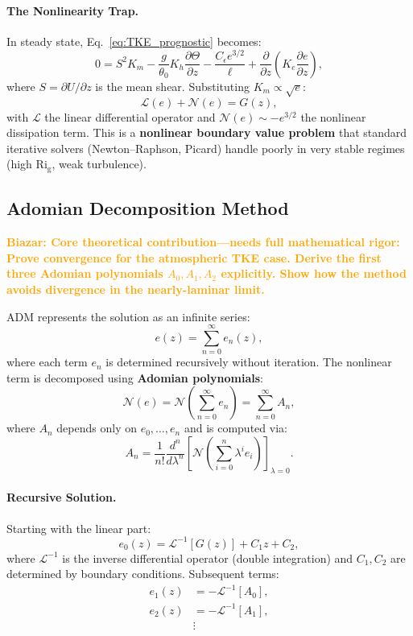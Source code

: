 \documentclass[twocolumn,11pt]{article}
\newcommand{\Rig}{\text{Ri}_{\text{g}}}
\newcommand{\BIAZAR}[1]{\textcolor{orange}{\textbf{Biazar: #1}}}
\begin{document}
\paragraph{The Nonlinearity Trap.} In steady state, Eq.~\eqref{eq:TKE_prognostic} becomes:
\begin{equation}
0 = S^2 K_m - \frac{g}{\theta_0}K_h\frac{\partial \Theta}{\partial z} - \frac{C_\epsilon e^{3/2}}{\ell} + \frac{\partial}{\partial z}\left(K_e \frac{\partial e}{\partial z}\right),
\end{equation}
where $S = \partial U / \partial z$ is the mean shear. Substituting $K_m \propto \sqrt{e}$:
\begin{equation}
\mathcal{L}(e) + \mathcal{N}(e) = G(z),
\end{equation}
with $\mathcal{L}$ the linear differential operator and $\mathcal{N}(e) \sim -e^{3/2}$ the nonlinear dissipation term. This is a \textbf{nonlinear boundary value problem} that standard iterative solvers (Newton--Raphson, Picard) handle poorly in very stable regimes (high $\Rig$, weak turbulence).

\subsection{Adomian Decomposition Method}

\BIAZAR{Core theoretical contribution—needs full mathematical rigor: Prove convergence for the atmospheric TKE case. Derive the first three Adomian polynomials $A_0, A_1, A_2$ explicitly. Show how the method avoids divergence in the nearly-laminar limit.}

ADM represents the solution as an infinite series:
\begin{equation}
e(z) = \sum_{n=0}^\infty e_n(z),
\end{equation}
where each term $e_n$ is determined recursively without iteration. The nonlinear term is decomposed using \textbf{Adomian polynomials}:
\begin{equation}
\mathcal{N}(e) = \mathcal{N}\left(\sum_{n=0}^\infty e_n\right) = \sum_{n=0}^\infty A_n,
\end{equation}
where $A_n$ depends only on $e_0, \ldots, e_n$ and is computed via:
\begin{equation}
A_n = \frac{1}{n!}\frac{d^n}{d\lambda^n}\left[\mathcal{N}\left(\sum_{i=0}^n \lambda^i e_i\right)\right]_{\lambda=0}.
\end{equation}

\paragraph{Recursive Solution.} Starting with the linear part:
\begin{equation}
e_0(z) = \mathcal{L}^{-1}[G(z)] + C_1 z + C_2,
\end{equation}
where $\mathcal{L}^{-1}$ is the inverse differential operator (double integration) and $C_1, C_2$ are determined by boundary conditions. Subsequent terms:
\begin{align}
e_1(z) &= -\mathcal{L}^{-1}[A_0], \\
e_2(z) &= -\mathcal{L}^{-1}[A_1], \\
&\vdots
\end{align}
\end{document}

